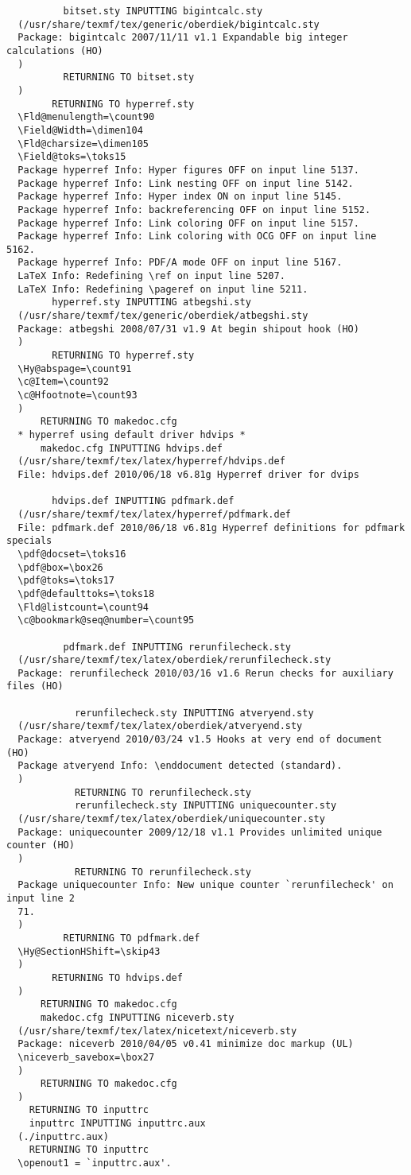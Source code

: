 \documentclass[fleqn]{article}%
\begin{document}
\begin{verbatim}
          bitset.sty INPUTTING bigintcalc.sty 
  (/usr/share/texmf/tex/generic/oberdiek/bigintcalc.sty
  Package: bigintcalc 2007/11/11 v1.1 Expandable big integer calculations (HO)
  )
          RETURNING TO bitset.sty 
  )
        RETURNING TO hyperref.sty 
  \Fld@menulength=\count90
  \Field@Width=\dimen104
  \Fld@charsize=\dimen105
  \Field@toks=\toks15
  Package hyperref Info: Hyper figures OFF on input line 5137.
  Package hyperref Info: Link nesting OFF on input line 5142.
  Package hyperref Info: Hyper index ON on input line 5145.
  Package hyperref Info: backreferencing OFF on input line 5152.
  Package hyperref Info: Link coloring OFF on input line 5157.
  Package hyperref Info: Link coloring with OCG OFF on input line 5162.
  Package hyperref Info: PDF/A mode OFF on input line 5167.
  LaTeX Info: Redefining \ref on input line 5207.
  LaTeX Info: Redefining \pageref on input line 5211.
        hyperref.sty INPUTTING atbegshi.sty 
  (/usr/share/texmf/tex/generic/oberdiek/atbegshi.sty
  Package: atbegshi 2008/07/31 v1.9 At begin shipout hook (HO)
  )
        RETURNING TO hyperref.sty 
  \Hy@abspage=\count91
  \c@Item=\count92
  \c@Hfootnote=\count93
  )
      RETURNING TO makedoc.cfg 
  * hyperref using default driver hdvips *
      makedoc.cfg INPUTTING hdvips.def 
  (/usr/share/texmf/tex/latex/hyperref/hdvips.def
  File: hdvips.def 2010/06/18 v6.81g Hyperref driver for dvips
  
        hdvips.def INPUTTING pdfmark.def 
  (/usr/share/texmf/tex/latex/hyperref/pdfmark.def
  File: pdfmark.def 2010/06/18 v6.81g Hyperref definitions for pdfmark specials
  \pdf@docset=\toks16
  \pdf@box=\box26
  \pdf@toks=\toks17
  \pdf@defaulttoks=\toks18
  \Fld@listcount=\count94
  \c@bookmark@seq@number=\count95
  
          pdfmark.def INPUTTING rerunfilecheck.sty 
  (/usr/share/texmf/tex/latex/oberdiek/rerunfilecheck.sty
  Package: rerunfilecheck 2010/03/16 v1.6 Rerun checks for auxiliary files (HO)
  
            rerunfilecheck.sty INPUTTING atveryend.sty 
  (/usr/share/texmf/tex/latex/oberdiek/atveryend.sty
  Package: atveryend 2010/03/24 v1.5 Hooks at very end of document (HO)
  Package atveryend Info: \enddocument detected (standard).
  )
            RETURNING TO rerunfilecheck.sty 
            rerunfilecheck.sty INPUTTING uniquecounter.sty 
  (/usr/share/texmf/tex/latex/oberdiek/uniquecounter.sty
  Package: uniquecounter 2009/12/18 v1.1 Provides unlimited unique counter (HO)
  )
            RETURNING TO rerunfilecheck.sty 
  Package uniquecounter Info: New unique counter `rerunfilecheck' on input line 2
  71.
  )
          RETURNING TO pdfmark.def 
  \Hy@SectionHShift=\skip43
  )
        RETURNING TO hdvips.def 
  )
      RETURNING TO makedoc.cfg 
      makedoc.cfg INPUTTING niceverb.sty 
  (/usr/share/texmf/tex/latex/nicetext/niceverb.sty
  Package: niceverb 2010/04/05 v0.41 minimize doc markup (UL)
  \niceverb_savebox=\box27
  )
      RETURNING TO makedoc.cfg 
  )
    RETURNING TO inputtrc 
    inputtrc INPUTTING inputtrc.aux 
  (./inputtrc.aux)
    RETURNING TO inputtrc 
  \openout1 = `inputtrc.aux'.
  

\end{verbatim}
\end{document}
